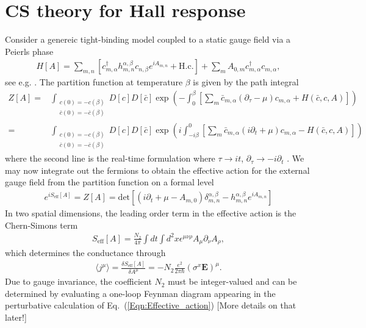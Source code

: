 \documentclass[english]{scrartcl}
\newcommand{\eq}[1]{Eq.~(\ref{#1})}
\begin{document}
\section{CS theory for Hall response}
Consider a genereic tight-binding model coupled to a static gauge field via a Peierls phase
\begin{align*}
H[A] = \sum_{m,n} \left[c_{m, \alpha}^\dagger h_{m,n}^{\alpha, \beta} c_{n, \beta} e^{i A_{m,n}} + \text{H.c.} \right] + \sum_m  A_{0, m} c_{m, \alpha}^\dagger c_{m, \alpha},
\end{align*}
see e.g. \cite{TFT_TI}. The partition function at temperature $\beta$ is given by the path integral
\begin{align*}
Z[A] =& \int_{\substack{c(0) = -c(\beta) \\ \bar c(0) = -\bar c(\beta)}} D[c] D[\bar c] \exp\left(-\int_0^\beta \left[ \sum_{m}  \bar c_{m, \alpha} (\partial_\tau - \mu) c_{m, \alpha} + H(\bar c, c, A) \right] \right) \\
=& \int_{\substack{c(0) = -c(\beta) \\ \bar c(0) = -\bar c(\beta)}} D[c] D[\bar c] \exp\left(i \int_{-i \beta}^{0} \left[ \sum_{m}  \bar c_{m, \alpha} (i\partial_t + \mu) c_{m, \alpha} - H(\bar c, c, A) \right] \right)
\end{align*}
where the second line is the real-time formulation where $\tau \to i t$, $\partial_\tau \to -i \partial_t$ \cite{TFT_TI, Altland_Simons}. We may now integrate out the fermions to obtain the effective action for the external gauge field from the partition function on a formal level
\begin{align}
e^{i S_\text{eff}[A]} = Z[A] = \text{det}\left[ (i \partial_t + \mu - A_{m,0}) \delta_{m,n}^{\alpha,\beta} - h_{m,n}^{\alpha,\beta} e^{i A_{m,n}}  \right] \label{Eqn:Effective_action}
\end{align}
In two spatial dimensions, the leading order term in the effective action is the Chern-Simons term
\begin{align*}
S_\text{eff}[A] = \frac{N_2}{4 \pi} \int dt \int d^2x \epsilon^{\mu \nu \rho} A_\mu \partial_\nu A_\rho,
\end{align*}
which determines the conductance through
\begin{align*}
\langle j^\mu \rangle = \frac{\delta  S_\text{eff}[A]}{\delta A^\mu} = -N_2 \frac{e^2}{2 \pi \hbar} (\sigma^x \bm E)^\mu.
\end{align*}
Due to gauge invariance, the coefficient $N_2$ must be integer-valued and can be determined by evaluating a one-loop Feynman diagram appearing in the perturbative calculation of \eq{Eqn:Effective_action} \cite{Topological_order_parameters} {\color{red} [More details on that later!]}
\end{document}
